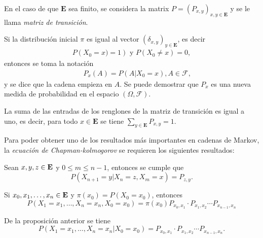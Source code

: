 \begin{Note}
En el caso de que $\mathbf{E}$ sea finito, se considera la matrix $P=\left(P_{x,y}\right)_{x,y\in \mathbf{E}}$ y se le llama \textit{matriz de transición}.
\end{Note}


\begin{Note}
Si la distribución inicial $\pi$ es igual al vector $\left(\delta_{x,y}\right)_{y\in\mathbf{E}}$, es decir
\begin{eqnarray*}
P\left(X_{0}=x)=1\right)\textrm{ y }P\left(X_{0}\neq x\right)=0,
\end{eqnarray*}
entonces se toma la notación 
\begin{eqnarray}
&&P_{x}\left(A\right)=P\left(A|X_{0}=x\right),A\in\mathcal{F},
\end{eqnarray}
y se dice que la cadena empieza en $A$. Se puede demostrar que $P_{x}$ es una nueva medida de probabilidad en el espacio $\left(\Omega,\mathcal{F}\right)$.
\end{Note}


\begin{Note}
La suma de las entradas de los renglones de la matriz de transición es igual a uno, es decir, para todo $x\in \mathbf{E}$ se tiene $\sum_{y\in\mathbf{E}}P_{x,y}=1$.
\end{Note}

Para poder obtener uno de los resultados más importantes en cadenas de Markov, la \textit{ecuación de Chapman-kolmogorov} se requieren los siguientes resultados:

\begin{Lema}
Sean $x,y,z\in\mathbf{E}$ y $0\leq m\leq n-1$, entonces se cumple que
\begin{equation}
P\left(X_{n+1}=y|X_{n}=z,X_{m}=x\right)=P_{z,y}.
\end{equation}
\end{Lema}


\begin{Prop}
Si $x_{0},x_{1},\ldots,x_{n}\in \mathbf{E}$ y $\pi\left(x_{0}\right)=P\left(X_{0}=x_{0}\right)$, entonces
\begin{equation}
P\left(X_{1}=x_{1},\ldots,X_{n}=x_{n},X_{0}=x_{0}\right)=\pi\left(x_{0}\right)P_{x_{0},x_{1}}\cdot P_{x_{1},x_{2}}\cdots P_{x_{n-1},x_{n}}
\end{equation}
\end{Prop}

De la proposición anterior se tiene
\begin{equation}
P\left(X_{1}=x_{1},\ldots,X_{n}=x_{n}|X_{0}=x_{0}\right)=P_{x_{0},x_{1}}\cdot P_{x_{1},x_{2}}\cdots P_{x_{n-1},x_{n}}.
\end{equation}

